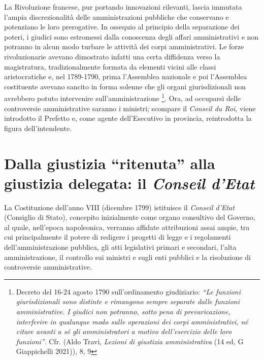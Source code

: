 \documentclass[12pt,it,a4paper,]{report}
\begin{document}
La Rivoluzione francese, pur portando innovazioni rilevanti, lascia
immutata l'ampia discrezionalità delle amministrazioni pubbliche che
conservano e potenziano le loro prerogative. In ossequio al principio
della separazione dei poteri, i giudici sono estromessi dalla conoscenza
degli affari amministrativi e non potranno in alcun modo turbare le
attività dei corpi amministrativi. Le forze rivoluzionarie avevano
dimostrato infatti una certa diffidenza verso la magistratura,
tradizionalmente formata da elementi vicini alle classi aristocratiche
e, nel 1789-1790, prima l'Assemblea nazionale e poi l'Assemblea
costituente avevano sancito in forma solenne che gli organi
giurisdizionali non avrebbero potuto intervenire sull'amministrazione
\footnote{Decreto del 16-24 agosto 1790 sull'ordinamento giudiziario:
  \emph{``Le funzioni giurisdizionali sono distinte e rimangono sempre
  separate dalle funzioni amministrative. I giudici non potranno, sotto
  pena di prevaricazione, interferire in qualunque modo sulle operazioni
  dei corpi amministrativi, né citare avanti a sé gli amministratori a
  motivo dell'esercizio delle loro funzioni''}. Cfr. (Aldo Travi,
  \emph{Lezioni di giustizia amministrativa} (14 ed, G Giappichelli
  2021)), 8, 9}. Ora, ad occuparsi delle controversie amministrative
saranno i ministri; scompare il \emph{Conseil du Roi}, viene introdotto
il Prefetto e, come agente dell'Esecutivo in provincia, reintrodotta la
figura dell'intendente.

\hypertarget{dalla-giustizia-ritenuta-alla-giustizia-delegata-il-conseil-detat}{%
\section{\texorpdfstring{Dalla giustizia ``ritenuta'' alla giustizia
delegata: il \emph{Conseil
d'Etat}}{Dalla giustizia ``ritenuta'' alla giustizia delegata: il Conseil d'Etat}}\label{dalla-giustizia-ritenuta-alla-giustizia-delegata-il-conseil-detat}}

La Costituzione dell'anno VIII (dicembre 1799) istituisce il
\emph{Conseil d'Etat} (Consiglio di Stato), concepito inizialmente come
organo consultivo del Governo, al quale, nell'epoca napoleonica,
verranno affidate attribuzioni assai ampie, tra cui principalmente il
potere di redigere i progetti di legge e i regolamenti
dell'amministrazione pubblica, gli atti legislativi primari e secondari,
l'alta amministrazione, il controllo sui ministri e sugli enti pubblici
e la risoluzione di controversie amministrative.
\end{document}

